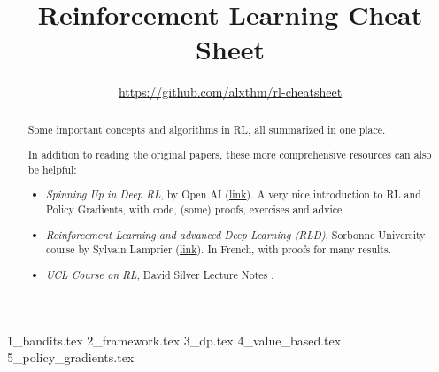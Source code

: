 \documentclass{article}
\title{\Large{Reinforcement Learning Cheat Sheet}}
\author{
  \url{https://github.com/alxthm/rl-cheatsheet}
}
\begin{document}
\maketitle

\begin{abstract}
Some important concepts and algorithms in RL, all summarized in one place.

In addition to reading the original papers, these more comprehensive resources can also be helpful:
\begin{itemize}
  \item \emph{Spinning Up in Deep RL}, by Open AI (\href{https://spinningup.openai.com/en/latest/index.html}{link}). A very nice introduction to RL and Policy Gradients, with code, (some) proofs, exercises and advice.
  \item \emph{Reinforcement Learning and advanced Deep Learning (RLD)}, Sorbonne University course by Sylvain Lamprier (\href{https://dac.lip6.fr/master/rladl/}{link}). In French, with proofs for many results.
  \item \emph{UCL Course on RL}, David Silver Lecture Notes \cite{silver2015}.
\end{itemize}


\end{abstract}

\setcounter{tocdepth}{3}
\tableofcontents{}
\newpage

{1_bandits.tex}
{2_framework.tex}
{3_dp.tex}
{4_value_based.tex}
{5_policy_gradients.tex}

\medskip

\footnotesize

\end{document}
